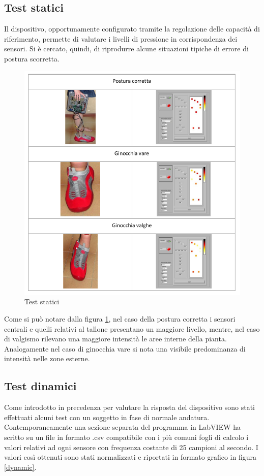 \documentclass[12pt,a4paper,oneside,openright,italian]{article}
\begin{document}
\subsection{Test statici}
Il dispositivo, opportunamente configurato tramite la regolazione delle capacit\`a di riferimento, permette di valutare i livelli di pressione in corrispondenza dei sensori. Si \`e cercato, quindi, di riprodurre alcune situazioni tipiche di errore di postura scorretta.

\begin{figure}[!hbp]
  \centering
  \includegraphics[width=370pt]{immagini/posture.png}
  \caption{Test statici}
  \label{static}
\end{figure}

Come si pu\`o notare dalla figura \ref{static}, nel caso della postura corretta i sensori centrali e quelli relativi al tallone presentano un maggiore livello, mentre, nel caso di valgismo rilevano una maggiore intensit\`a le aree interne della pianta. Analogamente nel caso di ginocchia vare si nota una visibile predominanza di intensit\`a nelle zone esterne.

\subsection{Test dinamici}
Come introdotto in precedenza per valutare la risposta del dispositivo sono stati effettuati alcuni test con un soggetto in fase di normale andatura. Contemporaneamente una sezione separata del programma in LabVIEW ha scritto su un file in formato .csv compatibile con i pi\`u comuni fogli di calcolo i valori relativi ad ogni sensore con frequenza costante di 25 campioni al secondo. I valori cos\`i ottenuti sono stati normalizzati e riportati in formato grafico in figura \ref{dynamic}.
\end{document}
